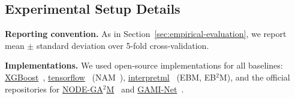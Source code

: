 \subsection{Experimental Setup Details}
\textbf{Reporting convention.}
As in Section~\ref{sec:empirical-evaluation}, we report mean $\pm$ standard deviation over 5-fold cross-validation.

\textbf{Implementations.} We used open-source implementations for all baselines: \href{https://xgboost.readthedocs.io/en/release_3.2.0/python/index.html}{XGBoost}~\cite{chen2016xgboost}, \href{https://www.tensorflow.org/}{tensorflow}~\cite{abadi2015tensorflow} (NAM~\cite{agarwal2021neural}), \href{https://interpret.ml/docs/}{interpretml}~\cite{nori2019interpretml} (EBM, EB$^2$M), and the official repositories for \href{https://github.com/zzzace2000/nodegam}{NODE-GA$^2$M}~\cite{chang2022node} and \href{https://github.com/ZebinYang/gaminet}{GAMI‐Net}~\cite{yang2020gami}.

